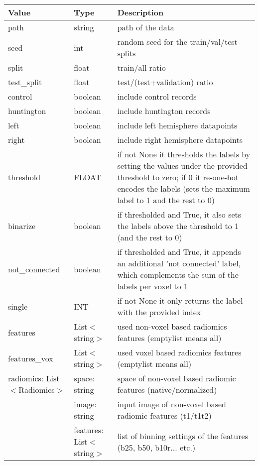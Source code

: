 \begin{longtable}[H]{|L{3cm}|L{3cm}|L{10cm}|}
\hline
\textbf{Value} & \textbf{Type} & \textbf{Description} \\ \hline
path & string & path of the data \\ \hline
seed & int & random seed for the train/val/test splits \\ \hline
split & float & train/all ratio \\ \hline
test\_split & float & test/(test+validation) ratio \\ \hline
control & boolean & include control records \\ \hline
huntington & boolean & include huntington records \\ \hline
left & boolean & include left hemisphere datapoints \\ \hline
right & boolean & include right hemisphere datapoints \\ \hline
threshold & FLOAT & if not None it thresholds the labels by setting the values under the provided threshold to zero; if 0 it re-one-hot encodes the labels (sets the maximum label to 1 and the rest to 0) \\ \hline
binarize & boolean & if thresholded and True, it also sets the labels above the threshold to 1 (and the rest to 0) \\ \hline
not\_connected & boolean & if thresholded and True, it appends an additional 'not connected' label, which complements the sum of the labels per voxel to 1 \\ \hline
single & INT & if not None it only returns the label with the provided index \\ \hline
features & List$<$string$>$ & used non-voxel based radiomics features (emptylist means all) \\ \hline
features\_vox & List$<$string$>$ & used voxel based radiomics features (emptylist means all) \\ \hline
radiomics: List$<$Radiomics$>$ & space: string & space of non-voxel based radiomic features \newline (native/normalized) \\ 
 & image: string & input image of non-voxel based radiomic features \newline (t1/t1t2) \\ 
 & features: List$<$string$>$ & list of binning settings of the features \newline (b25, b50, b10r... etc.) \\ 

\end{longtable}
